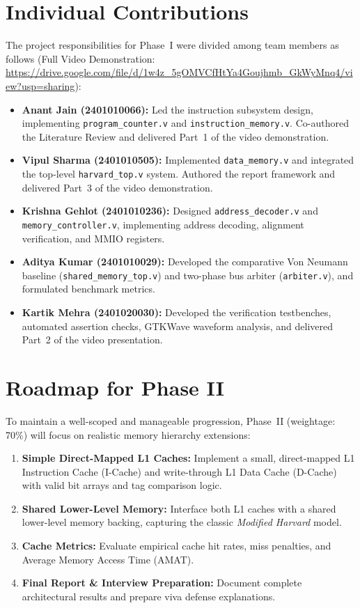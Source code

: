 \documentclass[conference]{IEEEtran}
\begin{document}
\section{Individual Contributions}
The project responsibilities for Phase~I were divided among team members as follows (Full Video Demonstration: \url{https://drive.google.com/file/d/1w4z_5gOMVCfHtYa4Goujhmb_GkWyMnq4/view?usp=sharing}):
\begin{itemize}
    \item \textbf{Anant Jain (2401010066):} Led the instruction subsystem design, implementing \texttt{program\_counter.v} and \texttt{instruction\_memory.v}. Co-authored the Literature Review and delivered Part~1 of the video demonstration.
    \item \textbf{Vipul Sharma (2401010505):} Implemented \texttt{data\_memory.v} and integrated the top-level \texttt{harvard\_top.v} system. Authored the report framework and delivered Part~3 of the video demonstration.
    \item \textbf{Krishna Gehlot (2401010236):} Designed \texttt{address\_decoder.v} and \texttt{memory\_controller.v}, implementing address decoding, alignment verification, and MMIO registers.
    \item \textbf{Aditya Kumar (2401010029):} Developed the comparative Von Neumann baseline (\texttt{shared\_memory\_top.v}) and two-phase bus arbiter (\texttt{arbiter.v}), and formulated benchmark metrics.
    \item \textbf{Kartik Mehra (2401020030):} Developed the verification testbenches, automated assertion checks, GTKWave waveform analysis, and delivered Part~2 of the video presentation.
\end{itemize}

\section{Roadmap for Phase II}
To maintain a well-scoped and manageable progression, Phase~II (weightage: 70\%) will focus on realistic memory hierarchy extensions:
\begin{enumerate}
    \item \textbf{Simple Direct-Mapped L1 Caches:} Implement a small, direct-mapped L1 Instruction Cache (I-Cache) and write-through L1 Data Cache (D-Cache) with valid bit arrays and tag comparison logic.
    \item \textbf{Shared Lower-Level Memory:} Interface both L1 caches with a shared lower-level memory backing, capturing the classic \textit{Modified Harvard} model.
    \item \textbf{Cache Metrics:} Evaluate empirical cache hit rates, miss penalties, and Average Memory Access Time (AMAT).
    \item \textbf{Final Report \& Interview Preparation:} Document complete architectural results and prepare viva defense explanations.
\end{enumerate}
\end{document}
